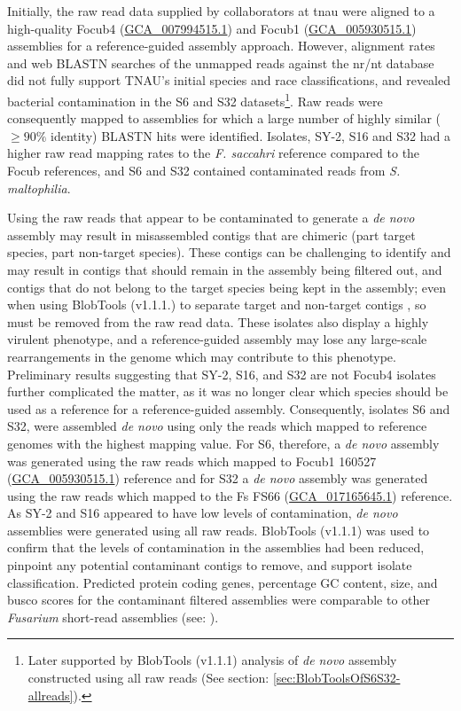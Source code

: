 Initially, the raw read data supplied by collaborators at \ac{tnau} were aligned to a high-quality \ac{Focub4} (\href{https://www.ncbi.nlm.nih.gov/datasets/genome/GCA_007994515.1/}{GCA\_007994515.1}) and \ac{Focub1} (\href{https://www.ncbi.nlm.nih.gov/datasets/genome/GCA_005930515.1/}{GCA\_005930515.1})  assemblies for a reference-guided assembly approach. However, alignment rates and web BLASTN searches of the unmapped reads against the nr/nt database did not fully support TNAU's initial species and race classifications, and revealed bacterial contamination in the S6 and S32 datasets\footnote{Later supported by BlobTools (v1.1.1) analysis of \textit{de novo} assembly constructed using all raw reads (See section: \ref{sec:BlobToolsOfS6S32-allreads}).}. Raw reads were consequently mapped to assemblies for which a large number of highly similar ($ \geq90\% $ identity) BLASTN hits were identified. Isolates, SY-2, S16 and S32 had a higher raw read mapping rates to the \textit{F. saccahri} reference compared to the \ac{Focub} references, and S6 and S32 contained contaminated reads from \textit{S. maltophilia}. 

Using the raw reads that appear to be contaminated to generate a \textit{de novo} assembly may result in misassembled contigs that are chimeric (part target species, part non-target species). These contigs can be challenging to identify and may result in contigs that should remain in the assembly being filtered out, and contigs that do not belong to the target species being kept in the assembly; even when using BlobTools (v1.1.1.) to separate target and non-target contigs \parencite{Cornet2022}, so must be removed from the raw read data.  These isolates also display a highly virulent phenotype, and a reference-guided assembly may lose any large-scale rearrangements in the genome which may contribute to this phenotype. Preliminary results suggesting that SY-2, S16, and S32 are not \ac{Focub4} isolates further complicated the matter, as it was no longer clear which species should be used as a reference for a reference-guided assembly.  Consequently, isolates S6 and S32, were assembled \textit{de novo} using only the reads which mapped to reference genomes with the highest mapping value. For S6, therefore, a \textit{de novo} assembly was generated using the raw reads which mapped to \ac{Focub1} 160527 (\href{https://www.ncbi.nlm.nih.gov/datasets/genome/GCA_005930515.1/}{GCA\_005930515.1}) reference and for S32 a \textit{de novo} assembly was generated using the raw reads which mapped to the \ac{Fs} FS66 (\href{https://www.ncbi.nlm.nih.gov/datasets/genome/GCA_017165645.1/}{GCA\_017165645.1}) reference. As SY-2 and S16 appeared to have low levels of contamination, \textit{de novo} assemblies were generated using all raw reads. BlobTools (v1.1.1) was used to confirm that the levels of contamination in the assemblies had been reduced, pinpoint any potential contaminant contigs to remove, and support isolate classification. Predicted protein coding genes, percentage GC content, size, and \ac{busco} scores for the contaminant filtered assemblies were comparable to other \textit{Fusarium} short-read assemblies (see: \textcite{DitaHerai2013, Chiara2015, Srivastava2018}).

